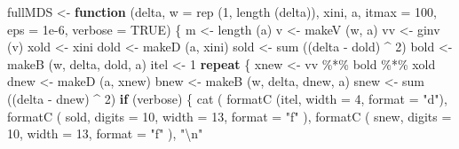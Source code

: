 \documentclass[
  12pt,
  letterpaper,
  DIV=11,
  numbers=noendperiod]{scrreprt}
\newenvironment{Shaded}{\begin{snugshade}}{\end{snugshade}}
\newcommand{\AttributeTok}[1]{\textcolor[rgb]{0.40,0.45,0.13}{#1}}
\newcommand{\ConstantTok}[1]{\textcolor[rgb]{0.56,0.35,0.01}{#1}}
\newcommand{\ControlFlowTok}[1]{\textcolor[rgb]{0.00,0.23,0.31}{\textbf{#1}}}
\newcommand{\DecValTok}[1]{\textcolor[rgb]{0.68,0.00,0.00}{#1}}
\newcommand{\FloatTok}[1]{\textcolor[rgb]{0.68,0.00,0.00}{#1}}
\newcommand{\FunctionTok}[1]{\textcolor[rgb]{0.28,0.35,0.67}{#1}}
\newcommand{\NormalTok}[1]{\textcolor[rgb]{0.00,0.23,0.31}{#1}}
\newcommand{\OtherTok}[1]{\textcolor[rgb]{0.00,0.23,0.31}{#1}}
\newcommand{\SpecialCharTok}[1]{\textcolor[rgb]{0.37,0.37,0.37}{#1}}
\newcommand{\StringTok}[1]{\textcolor[rgb]{0.13,0.47,0.30}{#1}}
\theoremstyle{remark}
\begin{document}
\begin{Shaded}
\begin{Highlighting}[]
\NormalTok{fullMDS }\OtherTok{\textless{}{-}}
  \ControlFlowTok{function}\NormalTok{ (delta,}
            \AttributeTok{w =} \FunctionTok{rep}\NormalTok{ (}\DecValTok{1}\NormalTok{, }\FunctionTok{length}\NormalTok{ (delta)),}
\NormalTok{            xini,}
\NormalTok{            a,}
            \AttributeTok{itmax =} \DecValTok{100}\NormalTok{,}
            \AttributeTok{eps =} \FloatTok{1e{-}6}\NormalTok{,}
            \AttributeTok{verbose =} \ConstantTok{TRUE}\NormalTok{) \{}
\NormalTok{    m }\OtherTok{\textless{}{-}} \FunctionTok{length}\NormalTok{ (a)}
\NormalTok{    v }\OtherTok{\textless{}{-}} \FunctionTok{makeV}\NormalTok{ (w, a)}
\NormalTok{    vv }\OtherTok{\textless{}{-}} \FunctionTok{ginv}\NormalTok{ (v)}
\NormalTok{    xold }\OtherTok{\textless{}{-}}\NormalTok{ xini}
\NormalTok{    dold }\OtherTok{\textless{}{-}} \FunctionTok{makeD}\NormalTok{ (a, xini)}
\NormalTok{    sold }\OtherTok{\textless{}{-}} \FunctionTok{sum}\NormalTok{ ((delta }\SpecialCharTok{{-}}\NormalTok{ dold) }\SpecialCharTok{\^{}} \DecValTok{2}\NormalTok{)}
\NormalTok{    bold }\OtherTok{\textless{}{-}} \FunctionTok{makeB}\NormalTok{ (w, delta, dold, a)}
\NormalTok{    itel }\OtherTok{\textless{}{-}} \DecValTok{1}
    \ControlFlowTok{repeat}\NormalTok{ \{}
\NormalTok{      xnew }\OtherTok{\textless{}{-}}\NormalTok{ vv }\SpecialCharTok{\%*\%}\NormalTok{ bold }\SpecialCharTok{\%*\%}\NormalTok{ xold}
\NormalTok{      dnew }\OtherTok{\textless{}{-}} \FunctionTok{makeD}\NormalTok{ (a, xnew)}
\NormalTok{      bnew }\OtherTok{\textless{}{-}} \FunctionTok{makeB}\NormalTok{ (w, delta, dnew, a)}
\NormalTok{      snew }\OtherTok{\textless{}{-}} \FunctionTok{sum}\NormalTok{ ((delta }\SpecialCharTok{{-}}\NormalTok{ dnew) }\SpecialCharTok{\^{}} \DecValTok{2}\NormalTok{)}
      \ControlFlowTok{if}\NormalTok{ (verbose) \{}
        \FunctionTok{cat}\NormalTok{ (}
          \FunctionTok{formatC}\NormalTok{ (itel, }\AttributeTok{width =} \DecValTok{4}\NormalTok{, }\AttributeTok{format =} \StringTok{"d"}\NormalTok{),}
          \FunctionTok{formatC}\NormalTok{ (}
\NormalTok{            sold,}
            \AttributeTok{digits =} \DecValTok{10}\NormalTok{,}
            \AttributeTok{width =} \DecValTok{13}\NormalTok{,}
            \AttributeTok{format =} \StringTok{"f"}
\NormalTok{          ),}
          \FunctionTok{formatC}\NormalTok{ (}
\NormalTok{            snew,}
            \AttributeTok{digits =} \DecValTok{10}\NormalTok{,}
            \AttributeTok{width =} \DecValTok{13}\NormalTok{,}
            \AttributeTok{format =} \StringTok{"f"}
\NormalTok{          ),}
          \StringTok{"}\SpecialCharTok{\textbackslash{}n}\StringTok{"}

\end{Highlighting}
\end{Shaded}
\end{document}
